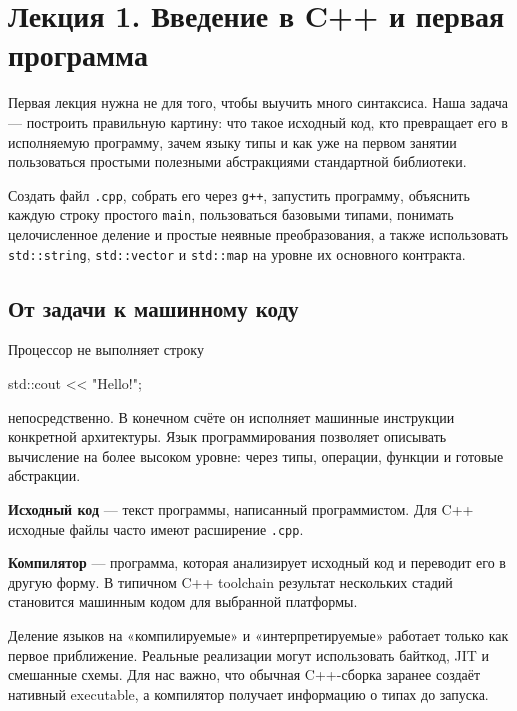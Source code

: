 \section{Лекция 1. Введение в C++ и первая программа}
\label{sec:lecture-01}

Первая лекция нужна не для того, чтобы выучить много синтаксиса.
Наша задача --- построить правильную картину: что такое исходный
код, кто превращает его в исполняемую программу, зачем языку типы и как уже
на первом занятии пользоваться простыми полезными абстракциями стандартной
библиотеки.

\begin{importantbox}
Создать файл \texttt{.cpp}, собрать его через \texttt{g++}, запустить программу,
объяснить каждую строку простого \texttt{main}, пользоваться базовыми типами,
понимать целочисленное деление и простые неявные преобразования, а также
использовать \texttt{std::string}, \texttt{std::vector} и \texttt{std::map}
на уровне их основного контракта.
\end{importantbox}

\subsection{От задачи к машинному коду}

Процессор не выполняет строку

\begin{cppcodeplain}
std::cout << "Hello!\n";
\end{cppcodeplain}

непосредственно. В конечном счёте он исполняет машинные инструкции конкретной
архитектуры. Язык программирования позволяет описывать вычисление на более
высоком уровне: через типы, операции, функции и готовые абстракции.

\begin{definition}
\textbf{Исходный код} --- текст программы, написанный программистом.
Для C++ исходные файлы часто имеют расширение \texttt{.cpp}.
\end{definition}

\begin{definition}
\textbf{Компилятор} --- программа, которая анализирует исходный код и переводит
его в другую форму. В типичном C++ toolchain результат нескольких стадий
становится машинным кодом для выбранной платформы.
\end{definition}

\begin{whybox}
Деление языков на «компилируемые» и «интерпретируемые» работает только как
первое приближение. Реальные реализации могут использовать байткод, JIT и
смешанные схемы. Для нас важно, что обычная C++-сборка заранее создаёт
нативный executable, а компилятор получает информацию о типах до запуска.
\end{whybox}

